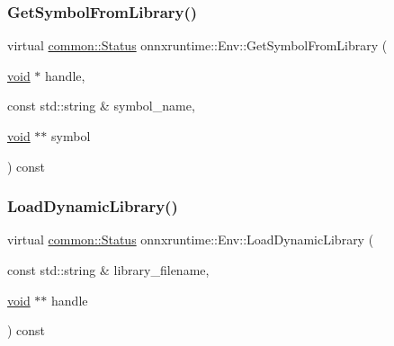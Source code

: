 \mbox{\label{classonnxruntime_1_1Env_a0ac6efcb6758ce44ff78c7eb158615b4}} 
\subsubsection{\texorpdfstring{Get\+Symbol\+From\+Library()}{GetSymbolFromLibrary()}}
{\footnotesize\ttfamily virtual \mbox{\hyperlink{classonnxruntime_1_1common_1_1Status}{common\+::\+Status}} onnxruntime\+::\+Env\+::\+Get\+Symbol\+From\+Library (\begin{DoxyParamCaption}\item[{\mbox{\hyperlink{mlasi_8h_a88f941d423cb2a819b70a1358982b1a6}{void}} $\ast$}]{handle,  }\item[{const std\+::string \&}]{symbol\+\_\+name,  }\item[{\mbox{\hyperlink{mlasi_8h_a88f941d423cb2a819b70a1358982b1a6}{void}} $\ast$$\ast$}]{symbol }\end{DoxyParamCaption}) const\hspace{0.3cm}{\ttfamily [pure virtual]}}

\mbox{\label{classonnxruntime_1_1Env_abc3cc65bf355845671d84421f0a00765}} 
\subsubsection{\texorpdfstring{Load\+Dynamic\+Library()}{LoadDynamicLibrary()}}
{\footnotesize\ttfamily virtual \mbox{\hyperlink{classonnxruntime_1_1common_1_1Status}{common\+::\+Status}} onnxruntime\+::\+Env\+::\+Load\+Dynamic\+Library (\begin{DoxyParamCaption}\item[{const std\+::string \&}]{library\+\_\+filename,  }\item[{\mbox{\hyperlink{mlasi_8h_a88f941d423cb2a819b70a1358982b1a6}{void}} $\ast$$\ast$}]{handle }\end{DoxyParamCaption}) const\hspace{0.3cm}{\ttfamily [pure virtual]}}


